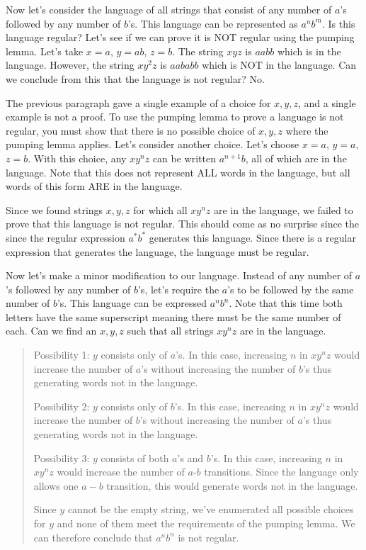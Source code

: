\documentclass[letterpaper,12pt,openany,reqno]{book}%
\begin{document}
Now let's consider the language of all strings that consist of any number of $a$'s followed by any number of $b$'s. This language can be represented as $a^n b^m$. Is this language regular? Let's see if we can prove it is NOT regular using the pumping lemma. Let's take $x=a$, $y=ab$, $z=b$. The string $xyz$ is $aabb$ which is in the language. However, the string $xy^2 z$ is $aababb$ which is NOT in the language. Can we conclude from this that the language is not regular? No.

The previous paragraph gave a single example of a choice for $x, y, z$, and a single example is not a proof. To use the pumping lemma to prove a language is not regular, you must show that there is no possible choice of $x, y, z$ where the pumping lemma applies. Let's consider another choice. Let's choose $x=a$, $y=a$, $z=b$. With this choice, any $xy^n z$ can be written $a^{n+1} b$, all of which are in the language. Note that this does not represent ALL words in the language, but all words of this form ARE in the language. 

Since we found strings $x, y, z$ for which all $xy^nz$ are in the language, we failed to prove that this language is not regular. This should come as no surprise since the since the regular expression $a^*b^*$ generates this language. Since there is a regular expression that generates the language, the language must be regular.

Now let's make a minor modification to our language. Instead of any number of $a$'s followed by any number of $b$'s, let's require the $a$'s to be followed by the same number of $b$'s. This language can be expressed $a^nb^n$. Note that this time both letters have the same superscript meaning there must be the same number of each. Can we find an $x, y, z$ such that all strings $xy^nz$ are in the language.

\begin{quote}
Possibility 1: $y$ consists only of $a$'s. In this case, increasing $n$ in $xy^nz$ would increase the number of $a$'s without increasing the number of $b$'s thus generating words not in the language.

Possibility 2: $y$ consists only of $b$'s. In this case, increasing $n$ in $xy^nz$ would increase the number of $b$'s without increasing the number of $a$'s thus generating words not in the language.

Possibility 3: $y$ consists of both $a$'s and $b$'s. In this case, increasing $n$ in $xy^nz$ would increase the number of $a$-$b$ transitions. Since the language only allows one $a-b$ transition, this would generate words not in the language.

Since $y$ cannot be the empty string, we've enumerated all possible choices for $y$ and none of them meet the requirements of the pumping lemma. We can therefore conclude that $a^nb^n$ is not regular.
\end{quote}
\end{document}
